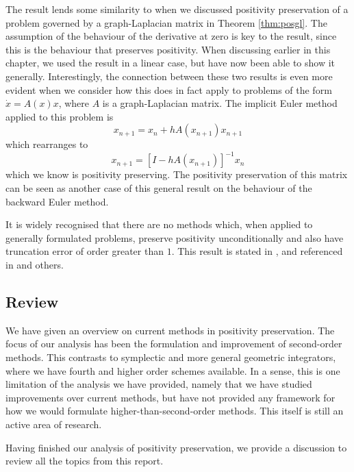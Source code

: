 The result lends some similarity to when we discussed positivity preservation of a problem governed by a graph-Laplacian matrix in Theorem \ref{thm:posgl}.
The assumption of the behaviour of the derivative at zero is key to the result, since this is the behaviour that preserves positivity.
When discussing earlier in this chapter, we used the result in a linear case, but have now been able to show it generally.
Interestingly, the connection between these two results is even more evident when we consider how this does in fact apply to problems of the form $\dot{x} = A(x)x$,
where $A$ is a graph-Laplacian matrix.
The implicit Euler method applied to this problem is 
\begin{equation*}
    x_{n+1} = x_n + h A(x_{n+1})x_{n+1}
\end{equation*}
which rearranges to
\begin{equation*}
    x_{n+1} = \left[
        I - h A(x_{n+1})
    \right]^{-1}x_n
\end{equation*}
which we know is positivity preserving.
The positivity preservation of this matrix can be seen as another case of this general result on the behaviour of the backward Euler method.

It is widely recognised that there are no methods which, when applied to generally formulated problems, preserve positivity unconditionally and also have truncation error of order greater than $1$.
This result is stated in \cite{bolley1978conservation}, and referenced in \cite{blanes_pos_2022, hundsdorfer2003numerical} and others. 

\subsection{Review}

We have given an overview on current methods in positivity preservation.
The focus of our analysis has been the formulation and improvement of second-order methods.
This contrasts to symplectic and more general geometric integrators,
where we have fourth and higher order schemes available.
In a sense, this is one limitation of the analysis we have provided,
namely that we have studied improvements over current methods,
but have not provided any framework for how we would formulate higher-than-second-order methods.
This itself is still an active area of research.

Having finished our analysis of positivity preservation, we provide a discussion to review all the topics from this report.
